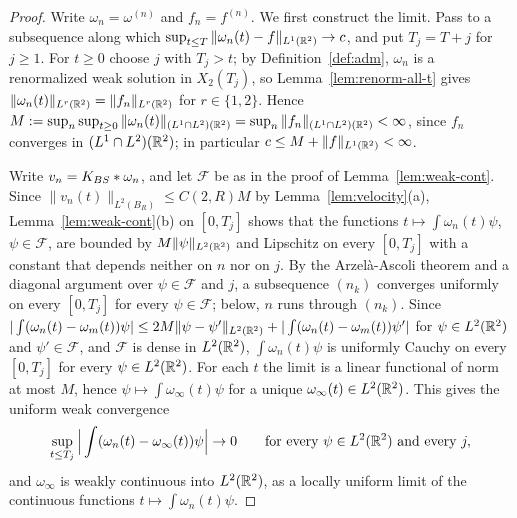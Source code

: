 \begin{proof}
Write $\omega_n=\omega^{(n)}$ and $f_n=f^{(n)}$. We first construct the limit.
Pass to a subsequence along which $\sup_{t\le T}\|\omega_n(t)-f\|_{L^1(\mathbb{R}^2)}\to c$,
and put $T_j=T+j$ for $j\ge1$. For $t\ge0$ choose $j$ with $T_j>t$; by
Definition~\ref{def:adm}, $\omega_n$ is a renormalized weak solution in
$X_2(T_j)$, so Lemma~\ref{lem:renorm-all-t} gives
$\|\omega_n(t)\|_{L^r(\mathbb{R}^2)}=\|f_n\|_{L^r(\mathbb{R}^2)}$ for $r\in\{1,2\}$. Hence
$M:=\sup_n\sup_{t\ge0}\|\omega_n(t)\|_{(L^1\cap L^2)(\mathbb{R}^2)}=\sup_n\|f_n\|_{(L^1\cap L^2)(\mathbb{R}^2)}<\infty$,
since $f_n$ converges in $(L^1\cap L^2)(\mathbb{R}^2)$; in particular
$c\le M+\|f\|_{L^1(\mathbb{R}^2)}<\infty$.

Write $v_n=K_{BS}\ast\omega_n$, and let $\mathcal F$ be as in the proof of
Lemma~\ref{lem:weak-cont}. Since
$\|v_n(t)\|_{L^2(B_R)}\le C(2,R)M$ by Lemma~\ref{lem:velocity}(a),
Lemma~\ref{lem:weak-cont}(b) on $[0,T_j]$ shows that the functions
$t\mapsto\int\omega_n(t)\psi$, $\psi\in\mathcal F$, are bounded by
$M\|\psi\|_{L^2(\mathbb{R}^2)}$ and Lipschitz on every $[0,T_j]$ with a constant that depends
neither on $n$ nor on $j$. By the Arzel\`a-Ascoli theorem and a diagonal
argument over $\psi\in\mathcal F$ and $j$, a subsequence $(n_k)$ converges
uniformly on every $[0,T_j]$ for every $\psi\in\mathcal F$; below, $n$ runs
through $(n_k)$. Since
$|\int(\omega_n(t)-\omega_m(t))\psi|\le2M\|\psi-\psi'\|_{L^2(\mathbb{R}^2)}+|\int(\omega_n(t)-\omega_m(t))\psi'|$
for $\psi\in L^2(\mathbb{R}^2)$ and $\psi'\in\mathcal F$, and $\mathcal F$ is dense in $L^2(\mathbb{R}^2)$,
$\int\omega_n(t)\psi$ is uniformly Cauchy on every $[0,T_j]$ for every
$\psi\in L^2(\mathbb{R}^2)$. For each $t$ the limit is a linear functional of norm at most
$M$, hence $\psi\mapsto\int\omega_\infty(t)\psi$ for a unique
$\omega_\infty(t)\in L^2(\mathbb{R}^2)$. This gives the uniform weak convergence
\[
\sup_{t\le T_j}\Big|\int(\omega_n(t)-\omega_\infty(t))\psi\Big|\to0
\qquad\text{for every }\psi\in L^2(\mathbb{R}^2)\text{ and every }j,
\]
and $\omega_\infty$ is weakly continuous into $L^2(\mathbb{R}^2)$, as a locally uniform limit
of the continuous functions $t\mapsto\int\omega_n(t)\psi$.


\end{proof}
